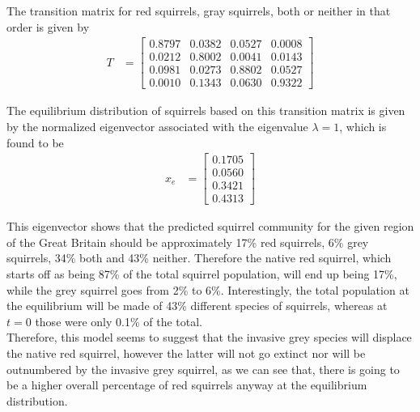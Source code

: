 The transition matrix for red squirrels, gray squirrels, both or neither in that order is given by
\begin{align*}
T  &= \begin{bmatrix}
    0.8797 & 0.0382 & 0.0527 & 0.0008 \\
    0.0212 & 0.8002 & 0.0041& 0.0143 \\
    0.0981 & 0.0273 & 0.8802 & 0.0527\\
    0.0010 & 0.1343 & 0.0630 & 0.9322
 	  \end{bmatrix}
\end{align*}

The equilibrium distribution of squirrels based on this transition matrix is given by the normalized eigenvector associated with the eigenvalue $\lambda=1$, which is found to be
\begin{align*}
    \textbf{$x_{e}$} &= \begin{bmatrix}
           0.1705 \\
           0.0560 \\
           0.3421 \\
           0.4313
         \end{bmatrix}
\end{align*}

This eigenvector shows that the predicted squirrel community for the given region of the Great Britain should be approximately 17\% red squirrels, 6\% grey squirrels, 34\% both and 43\% neither. Therefore the native red squirrel, which starts off as being 87\% of the total squirrel population, will end up being 17\%, while the grey squirrel goes from 2\% to 6\%. Interestingly, the total population at the equilibrium will be made of 43\% different species of squirrels, whereas at $t=0$ those were only 0.1\% of the total.\\
Therefore, this model seems to suggest that the invasive grey species will displace the native red squirrel, however the latter will not go extinct nor will be outnumbered by the invasive grey squirrel, as we can see that, there is going to be a higher overall percentage of red squirrels anyway at the equilibrium distribution.
